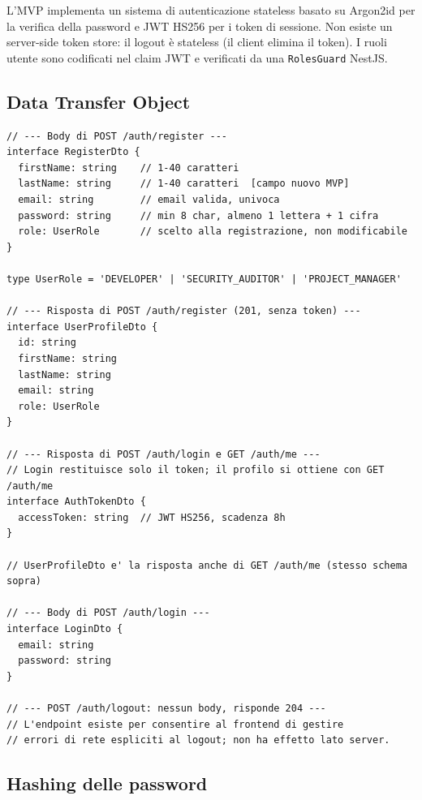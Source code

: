\documentclass[11pt,a4paper]{article}
\begin{document}
L'MVP implementa un sistema di autenticazione stateless basato su Argon2id per la verifica della password e JWT HS256 per i token di sessione. Non esiste un server-side token store: il logout è stateless (il client elimina il token). I ruoli utente sono codificati nel claim JWT e verificati da una \texttt{RolesGuard} NestJS.

\subsection{Data Transfer Object}

\begin{lstlisting}[caption={DTO di autenticazione. \texttt{lastName} è un campo obbligatorio nuovo rispetto al PoC; lo schema Mongoose deve includere \texttt{@Prop(\{required:true, trim:true\}) lastName: string}. La risposta di login restituisce solo \texttt{accessToken}; il profilo completo si ottiene con \texttt{GET /auth/me}.}]
// --- Body di POST /auth/register ---
interface RegisterDto {
  firstName: string    // 1-40 caratteri
  lastName: string     // 1-40 caratteri  [campo nuovo MVP]
  email: string        // email valida, univoca
  password: string     // min 8 char, almeno 1 lettera + 1 cifra
  role: UserRole       // scelto alla registrazione, non modificabile
}

type UserRole = 'DEVELOPER' | 'SECURITY_AUDITOR' | 'PROJECT_MANAGER'

// --- Risposta di POST /auth/register (201, senza token) ---
interface UserProfileDto {
  id: string
  firstName: string
  lastName: string
  email: string
  role: UserRole
}

// --- Risposta di POST /auth/login e GET /auth/me ---
// Login restituisce solo il token; il profilo si ottiene con GET /auth/me
interface AuthTokenDto {
  accessToken: string  // JWT HS256, scadenza 8h
}

// UserProfileDto e' la risposta anche di GET /auth/me (stesso schema sopra)

// --- Body di POST /auth/login ---
interface LoginDto {
  email: string
  password: string
}

// --- POST /auth/logout: nessun body, risponde 204 ---
// L'endpoint esiste per consentire al frontend di gestire
// errori di rete espliciti al logout; non ha effetto lato server.
\end{lstlisting}

\subsection{Hashing delle password}
\end{document}
